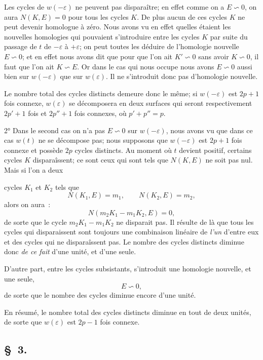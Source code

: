 \documentclass{article}
\begin{document}
Les cycles de $w(-\varepsilon)$ ne peuvent pas disparaître; en effet comme on a $E \backsim 0$, on aura $N(K, E) = 0$ pour tous les cycles $K$. De plus aucun de ces cycles $K$ ne peut devenir homologue à zéro. Nous avons vu en effet quelles étaient les nouvelles homologies qui pouvaient s'introduire entre les cycles $K$ par suite du passage de $t$ de $-\varepsilon$ à $+\varepsilon$; on peut toutes les déduire de l'homologie nouvelle $E \backsim 0$; et en effet nous avons dit que pour que l'on ait $K' \backsim 0$ sans avoir $K \backsim 0$, il faut que l'on ait $K \backsim E$. Or dans le cas qui nous occupe nous avons $E \backsim 0$ aussi bien sur $w(-\varepsilon)$ que sur $w(\varepsilon)$. Il ne s'introduit donc pas d'homologie nouvelle.

Le nombre total des cycles distincts demeure donc le même; si $w(-\varepsilon)$ est $2p + 1$ fois connexe, $w(\varepsilon)$ se décomposera en deux surfaces qui seront respectivement $2p' + 1$ fois et $2p'' + 1$ fois connexes, où $p' + p'' = p$.

2° Dans le second cas on n'a pas $E \backsim 0$ sur $w(-\varepsilon)$, nous avons vu que dans ce cas $w(t)$ ne se décompose pas; nous supposons que $w(-\varepsilon)$ est $2p + 1$ fois connexe et possède $2p$ cycles distincts. Au moment où $t$ devient positif, certains cycles $K$ disparaîssent; ce sont ceux qui sont tels que $N(K, E)$ ne soit pas nul. Mais si l'on a deux

cycles $K_{1}$ et $K_{2}$ tels que
\[ N(K_{1}, E) = m_{1}, \qquad N(K_{2}, E) = m_{2}, \]
alors on aura~:
\[ N(m_{2} K_{1} - m_{1} K_{2}, E) = 0, \]
de sorte que le cycle $m_{2} K_{1} - m_{1} K_{2}$ ne disparait pas. Il résulte de là que tous les cycles qui disparaissent sont toujours une combinaison linéaire de \emph{l'un} d'entre eux et des cycles qui ne disparaîssent pas. Le nombre des cycles distincts diminue donc \emph{de ce fait} d'une unité, et d'une seule.

D'autre part, entre les cycles subsistants, s'introduit une homologie nouvelle, et une seule,
\[ E \backsim 0, \]
de sorte que le nombre des cycles diminue encore d'une unité.

En résumé, le nombre total des cycles distincts diminue en tout de deux unités, de sorte que $w(\varepsilon)$ est $2p - 1$ fois connexe.

\subsection*{\S~3.}
\end{document}
